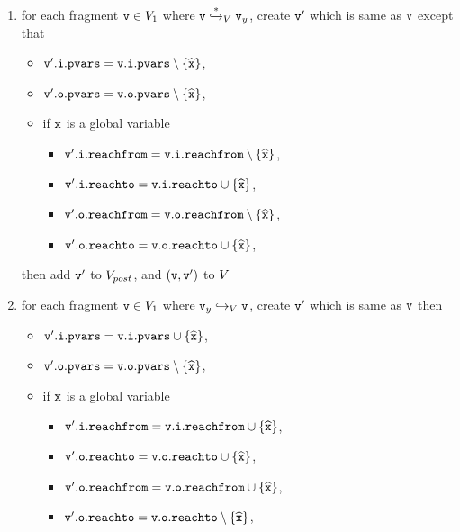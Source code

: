\begin{enumerate}
\item  for each fragment $\mathtt{v} \in V_1$ where $\mathtt{v} \overset{*}\hookrightarrow_{V} \mathtt{v}_y$, create $\mathtt{v}'$ which is same as $\mathtt{v}$ except that
\begin{itemize}
\item $\mathtt{v}'.\mathtt{i}.\mathtt{pvars} = \mathtt{v}.\mathtt{i}.\mathtt{pvars} \setminus \left\{\widehat{\mathtt{x}}\right\}$,
\item $\mathtt{v}'.\mathtt{o}.\mathtt{pvars} = \mathtt{v}.\mathtt{o}.\mathtt{pvars} \setminus \left\{\widehat{\mathtt{x}}\right\}$,
\item if $\tt x$ is a global variable
\begin{itemize}
\item $\mathtt{v}'.\mathtt{i}.\mathtt{reachfrom} = \mathtt{v}.\mathtt{i}.\mathtt{reachfrom} \setminus \left\{\widehat{\mathtt{x}}\right\}$,
\item $\mathtt{v}'.\mathtt{i}.\mathtt{reachto} = \mathtt{v}.\mathtt{i}.\mathtt{reachto} \cup \left\{\widehat{\mathtt{x}}\right\}$,
\item $\mathtt{v}'.\mathtt{o}.\mathtt{reachfrom} = \mathtt{v}.\mathtt{o}.\mathtt{reachfrom} \setminus \left\{\widehat{\mathtt{x}}\right\}$,
\item $\mathtt{v}'.\mathtt{o}.\mathtt{reachto} = \mathtt{v}.\mathtt{o}.\mathtt{reachto} \cup \left\{\widehat{\mathtt{x}}\right\}$,
\end{itemize}
\end{itemize}
then add $\mathtt{v}'$ to $V_{post}$, and $(\mathtt{v},\mathtt{v}')$ to $V$
\item for each fragment $\mathtt{v} \in V_1$ where $\mathtt{v}_y \hookrightarrow_{V} \mathtt{v}$, create $\mathtt{v}'$ which is same as $\mathtt{v}$ then
\begin{itemize}
\item $\mathtt{v}'.\mathtt{i}.\mathtt{pvars} = \mathtt{v}.\mathtt{i}.\mathtt{pvars} \cup \left\{\widehat{\mathtt{x}}\right\}$,
\item $\mathtt{v}'.\mathtt{o}.\mathtt{pvars} = \mathtt{v}.\mathtt{o}.\mathtt{pvars} \setminus \left\{\widehat{\mathtt{x}}\right\}$,
\item if $\tt x$ is a global variable
\begin{itemize}
\item $\mathtt{v}'.\mathtt{i}.\mathtt{reachfrom} = \mathtt{v}.\mathtt{i}.\mathtt{reachfrom} \cup \left\{\widehat{\mathtt{x}}\right\}$,
 \item $\mathtt{v}'.\mathtt{o}.\mathtt{reachto} = \mathtt{v}.\mathtt{o}.\mathtt{reachto} \cup \left\{\widehat{\mathtt{x}}\right\}$,
 \item $\mathtt{v}'.\mathtt{o}.\mathtt{reachfrom} = \mathtt{v}.\mathtt{o}.\mathtt{reachfrom} \cup \left\{\widehat{\mathtt{x}}\right\}$,
 \item $\mathtt{v}'.\mathtt{o}.\mathtt{reachto} = \mathtt{v}.\mathtt{o}.\mathtt{reachto} \setminus \left\{\widehat{\mathtt{x}}\right\}$,

\end{itemize}
\end{itemize}
\end{enumerate}
